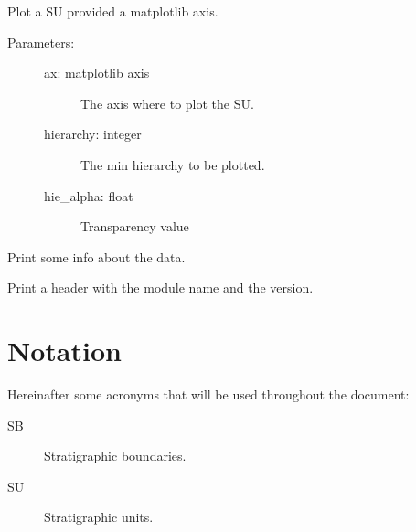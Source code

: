\documentclass[letterpaper,10pt,english]{sphinxmanual}
\begin{document}

\begin{fulllineitems}
\label{\detokenize{hiegeo:hiegeo.plot_su_ax}}
Plot a SU provided a matplotlib axis.
\begin{description}
\item[{Parameters:}] \leavevmode\begin{description}
\item[{ax: matplotlib axis}] \leavevmode
The axis where to plot the SU.

\item[{hierarchy: integer}] \leavevmode
The min hierarchy to be plotted.

\item[{hie\_alpha: float}] \leavevmode
Transparency value

\end{description}

\end{description}

\end{fulllineitems}


\begin{fulllineitems}
\label{\detokenize{hiegeo:hiegeo.print_data_info}}
Print some info about the data.

\end{fulllineitems}


\begin{fulllineitems}
\label{\detokenize{hiegeo:hiegeo.print_start}}
Print a header with the module name and the version.

\end{fulllineitems}



\chapter{Notation}
\label{\detokenize{index:notation}}
Hereinafter some acronyms that will be used throughout the document:
\begin{description}
\item[{SB}] \leavevmode
Stratigraphic boundaries.

\item[{SU}] \leavevmode
Stratigraphic units.

\end{description}
\end{document}
